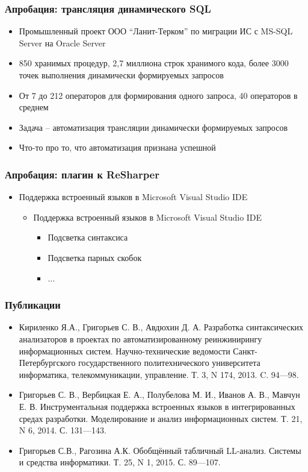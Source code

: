 \documentclass{beamer}
\begin{document}
\begin{frame}[t]
    \transwipe[direction=90]
    \frametitle{Апробация: трансляция динамического SQL}
    \begin{itemize}
        \item Промышленный проект ООО ``Ланит-Терком'' по миграции ИС с MS-SQL Server на Oracle Server
        \item 850 хранимых процедур, 2,7 миллиона строк хранимого кода, более 3000 точек выполнения динамически формируемых запросов
        \item От 7 до 212 операторов для формирования одного запроса, 40 операторов в среднем
        \item Задача -- автоматизация трансляции динамически формируемых запросов
        \item Что-то про то, что автоматизация признана успешной
    \end{itemize}
\end{frame}

\begin{frame}[t]
    \transwipe[direction=90]
    \frametitle{Апробация: плагин к ReSharper}
    \begin{itemize}
        \item Поддержка встроенный языков в Microsoft Visual Studio IDE
        \begin{itemize}
            \item Поддержка встроенный языков в Microsoft Visual Studio IDE
            \begin{itemize}
                \item Подсветка синтаксиса
                \item Подсветка парных скобок
                \item ...
            \end{itemize}
        \end{itemize}
    \end{itemize}
\end{frame}

\begin{frame}
    \transwipe[direction=90]
    \frametitle{Публикации}
  \begin{itemize}
      \item Кириленко Я.А., Григорьев С. В., Авдюхин Д. А. Разработка синтаксических анализаторов в проектах по автоматизированному реинжинирингу информационных систем.  Научно-технические ведомости Санкт-Петербургского государственного политехнического университета информатика, телекоммуникации, управление. Т. 3, N 174, 2013. C. 94---98.
      \item Григорьев С. В., Вербицкая Е. А., Полубелова М. И., Иванов А. В., Мавчун Е. В. Инструментальная поддержка встроенных языков в интегрированных средах разработки. Моделирование и анализ информационных систем. Т. 21, N 6, 2014. С. 131---143.
      \item Григорьев С.В., Рагозина А.К. Обобщённый табличный LL-анализ. Системы и средства информатики. Т. 25, N 1, 2015. С. 89---107.
  \end{itemize} 
\end{frame}
\end{document}
